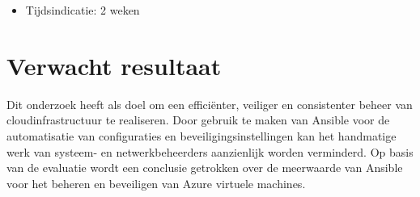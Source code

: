 \begin{itemize}
  \item Tijdsindicatie: 2 weken
\end{itemize}

\section{Verwacht resultaat}%
\label{sec:verwachte_resultaten}

Dit onderzoek heeft als doel om een efficiënter, veiliger en consistenter beheer van cloudinfrastructuur te realiseren.
Door gebruik te maken van Ansible voor de automatisatie van configuraties en beveiligingsinstellingen kan het handmatige werk van systeem- en netwerkbeheerders aanzienlijk worden verminderd.
Op basis van de evaluatie wordt een conclusie getrokken over de meerwaarde van Ansible voor het beheren en beveiligen van Azure virtuele machines.
